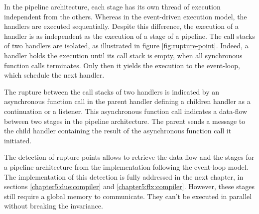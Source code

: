 In the pipeline architecture, each stage has its own thread of execution independent from the others.
Whereas in the event-driven execution model, the handlers are executed sequentially.
Despite this difference, the execution of a handler is as independent as the execution of a stage of a pipeline.
The call stacks of two handlers are isolated, as illustrated in figure \ref{fig:rupture-point}.
Indeed, a handler holds the execution until its call stack is empty, when all synchronous function calls terminates. Only then it yields the execution to the event-loop, which schedule the next handler.

The rupture between the call stacks of two handlers is indicated by an asynchronous function call in the parent handler defining a children handler as a continuation or a listener.
This asynchronous function call indicates a data-flow between two stages in the pipeline architecture.
The parent sends a message to the child handler containing the result of the asynchronous function call it initiated.


The detection of rupture points allows to retrieve the data-flow and the stages for a pipeline architecture from the implementation following the event-loop model.
The implementation of this detection is fully addressed in the next chapter, in sections \ref{chapter5:due:compiler} and \ref{chapter5:flx:compiler}.
However, these stages still require a global memory to communicate.
They can't be executed in parallel without breaking the invariance.

